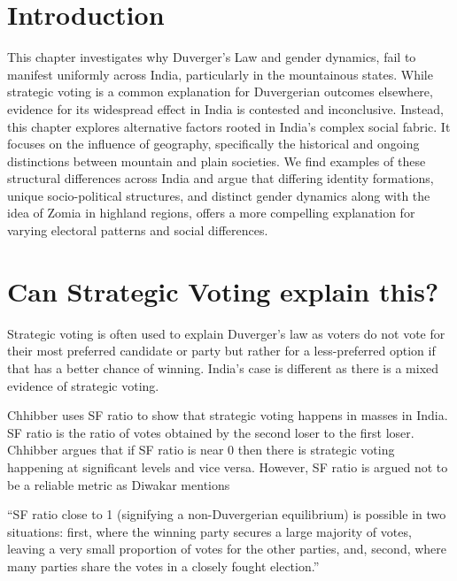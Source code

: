 \section{Introduction}
\begin{sloppypar}

This chapter investigates why Duverger’s Law and gender dynamics, fail to manifest uniformly across India, particularly in the mountainous states. While strategic voting is a common explanation for Duvergerian outcomes elsewhere, evidence for its widespread effect in India is contested and inconclusive. Instead, this chapter explores alternative factors rooted in India’s complex social fabric. It focuses on the  influence of geography, specifically the historical and ongoing distinctions between mountain and plain societies. We find examples of these structural differences across India and argue that differing identity formations, unique socio\hyp{}political structures, and distinct gender dynamics along with the idea of Zomia in highland regions, offers a more compelling explanation for varying electoral patterns and social differences. 

\end{sloppypar}
\section{Can Strategic Voting explain this?}

Strategic voting is often used to explain Duverger’s law as voters do not vote for their most preferred candidate or party but rather for a less\hyp{}preferred option if that has a better chance of winning. India’s case is different as there is a mixed evidence of strategic voting. 

\vspace{0.3cm}

Chhibber uses SF ratio to show that strategic voting happens in masses in India. SF ratio is the ratio of votes obtained by the second loser to the first loser. Chhibber argues that if SF ratio is near 0 then there is strategic voting happening at significant levels and vice versa. However, SF ratio is argued not to be a reliable metric as Diwakar mentions 

\vspace{0.3cm}

“SF ratio close to 1 (signifying a non\hyp{}Duvergerian equilibrium) is possible in two situations: first, where the winning party secures a large majority of votes, leaving a very small proportion of votes for the other parties, and, second, where many parties share the votes in a closely fought election.”

